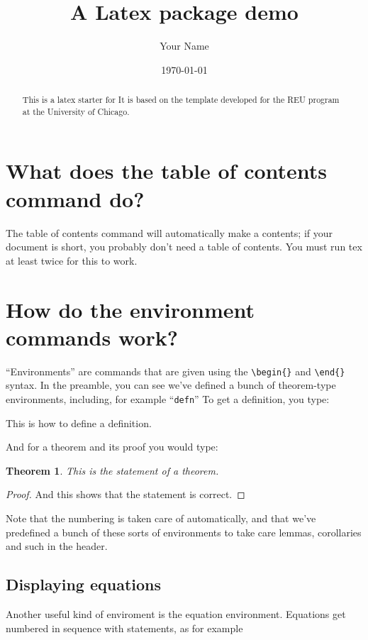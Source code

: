 \documentclass[11pt,oneside,draft]{amsart}
\title{A Latex package demo}
\author{Your Name}
\date{\today}
\numberwithin{equation}{section} %
\numberwithin{figure}{section} %
\theoremstyle{plain} %
\newtheorem{thm}{Theorem}[section]
\theoremstyle{definition} %
\theoremstyle{remark} %
\begin{document}
\begin{abstract}
  This is a latex starter for It is based on the template developed for the REU
  program at the University of Chicago.
\end{abstract}

\maketitle

\tableofcontents

\section{What does the table of contents command do?}

The table of contents command will automatically make a contents; if
your document is short, you probably don't need a table of contents.
You must run tex at least twice for this to work.

\section{How do the environment commands work?}\label{env-commands}

``Environments'' are commands that are given using the \verb|\begin{}|
  and \verb|\end{}| syntax. In the preamble, you can see we've defined
  a bunch of theorem-type environments, including, for example ``\texttt{defn}'' To get a definition, 
you type:

\begin{defn}  This is how to define a definition.
\end{defn}

And for a theorem and its proof you would type:

\begin{thm}\label{atheorem}
This is the statement of a theorem.
\end{thm}
\begin{proof}
And this shows that the statement is correct.
\end{proof}

Note that the numbering is taken care of automatically, and that we've predefined a bunch of these sorts of environments to take care lemmas, corollaries and such in the header. 

\subsection{Displaying equations}
Another useful kind of enviroment is the equation environment.  Equations
get numbered in sequence with statements, as for example
\end{document}
